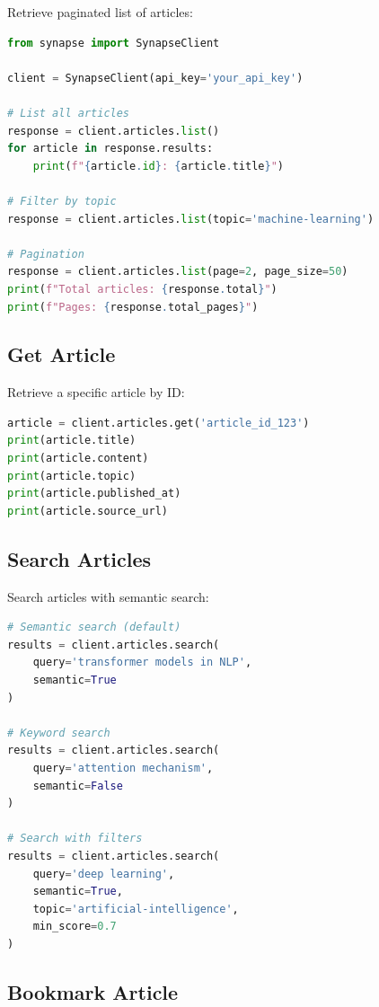\documentclass{report}
\begin{document}
Retrieve paginated list of articles:

\begin{lstlisting}[language=Python]
from synapse import SynapseClient

client = SynapseClient(api_key='your_api_key')

# List all articles
response = client.articles.list()
for article in response.results:
    print(f"{article.id}: {article.title}")

# Filter by topic
response = client.articles.list(topic='machine-learning')

# Pagination
response = client.articles.list(page=2, page_size=50)
print(f"Total articles: {response.total}")
print(f"Pages: {response.total_pages}")
\end{lstlisting}

\subsection{Get Article}

Retrieve a specific article by ID:

\begin{lstlisting}[language=Python]
article = client.articles.get('article_id_123')
print(article.title)
print(article.content)
print(article.topic)
print(article.published_at)
print(article.source_url)
\end{lstlisting}

\subsection{Search Articles}

Search articles with semantic search:

\begin{lstlisting}[language=Python]
# Semantic search (default)
results = client.articles.search(
    query='transformer models in NLP',
    semantic=True
)

# Keyword search
results = client.articles.search(
    query='attention mechanism',
    semantic=False
)

# Search with filters
results = client.articles.search(
    query='deep learning',
    semantic=True,
    topic='artificial-intelligence',
    min_score=0.7
)
\end{lstlisting}

\subsection{Bookmark Article}
\end{document}
